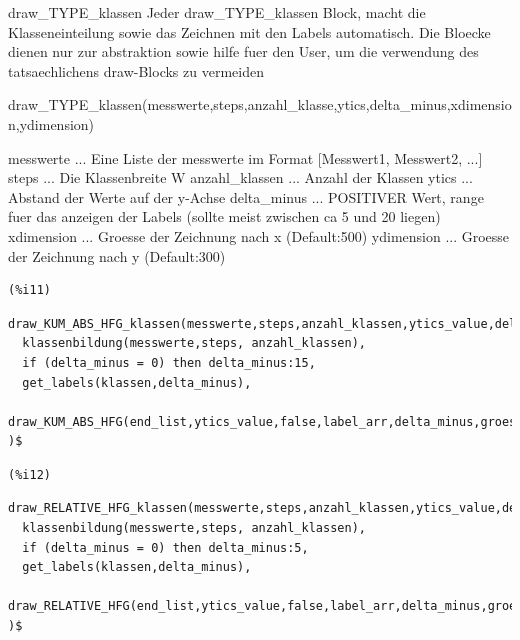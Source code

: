 \documentclass{article}
\begin{document}
draw\_TYPE\_klassen
    Jeder draw\_TYPE\_klassen Block, macht die Klasseneinteilung sowie das Zeichnen mit den Labels automatisch.
    Die Bloecke dienen nur zur abstraktion sowie hilfe fuer den User, um die verwendung des tatsaechlichens draw-Blocks zu vermeiden


draw\_TYPE\_klassen(messwerte,steps,anzahl\_klasse,ytics,delta\_minus,xdimension,ydimension)

messwerte       ... Eine Liste der messwerte im Format [Messwert1, Messwert2, ...]
steps           ... Die Klassenbreite W
anzahl\_klassen  ... Anzahl der Klassen
ytics           ... Abstand der Werte auf der y-Achse
delta\_minus     ... POSITIVER Wert, range fuer das anzeigen der Labels (sollte meist zwischen ca 5 und 20 liegen)
xdimension      ... Groesse der Zeichnung nach x (Default:500)
ydimension      ... Groesse der Zeichnung nach y (Default:300)

\noindent
\begin{minipage}[t]{8ex}{\color{red}\bf
\begin{verbatim}
(%i11) 
\end{verbatim}}
\end{minipage}
\begin{minipage}[t]{\textwidth}{\color{blue}
\begin{verbatim}
draw_KUM_ABS_HFG_klassen(messwerte,steps,anzahl_klassen,ytics_value,delta_minus,groesse1,groesse2):=block(
  klassenbildung(messwerte,steps, anzahl_klassen),
  if (delta_minus = 0) then delta_minus:15,
  get_labels(klassen,delta_minus),
  draw_KUM_ABS_HFG(end_list,ytics_value,false,label_arr,delta_minus,groesse1,groesse2)
)$
\end{verbatim}}
\end{minipage}


\noindent
\begin{minipage}[t]{8ex}{\color{red}\bf
\begin{verbatim}
(%i12) 
\end{verbatim}}
\end{minipage}
\begin{minipage}[t]{\textwidth}{\color{blue}
\begin{verbatim}
draw_RELATIVE_HFG_klassen(messwerte,steps,anzahl_klassen,ytics_value,delta_minus,groesse1,groesse2):=block(
  klassenbildung(messwerte,steps, anzahl_klassen),
  if (delta_minus = 0) then delta_minus:5,
  get_labels(klassen,delta_minus),
  draw_RELATIVE_HFG(end_list,ytics_value,false,label_arr,delta_minus,groesse1,groesse2)
)$
\end{verbatim}}
\end{minipage}
\end{document}

